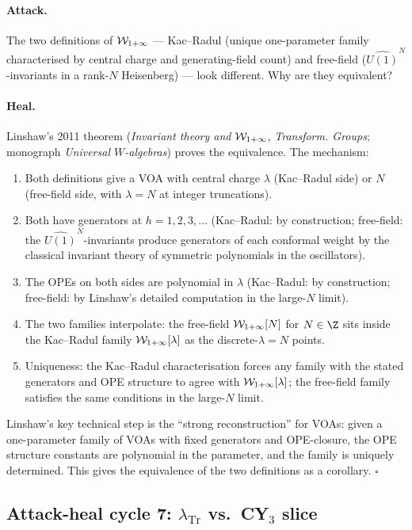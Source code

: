 \paragraph{Attack.}
The two definitions of $\mathcal{W}_{1+\infty}$ --- Kac--Radul (unique one-parameter family
characterised by central charge and generating-field count) and free-field
($\widehat{U(1)}^N$-invariants in a rank-$N$ Heisenberg) --- look different. Why are
they equivalent?

\paragraph{Heal.}
Linshaw's 2011 theorem (\emph{Invariant theory and $\mathcal{W}_{1+\infty}$}, \emph{Transform. Groups};
monograph \emph{Universal $W$-algebras}) proves the equivalence. The mechanism:
\begin{enumerate}
\item Both definitions give a VOA with central charge $\lambda$ (Kac--Radul side) or
$N$ (free-field side, with $\lambda = N$ at integer truncations).
\item Both have generators at $h = 1, 2, 3, \ldots$ (Kac--Radul: by construction;
free-field: the $\widehat{U(1)}^N$-invariants produce generators of each conformal weight
by the classical invariant theory of symmetric polynomials in the oscillators).
\item The OPEs on both sides are polynomial in $\lambda$ (Kac--Radul: by construction;
free-field: by Linshaw's detailed computation in the large-$N$ limit).
\item The two families interpolate: the free-field $\mathcal{W}_{1+\infty}[N]$ for $N \in \Z$ sits
inside the Kac--Radul family $\mathcal{W}_{1+\infty}[\lambda]$ as the discrete-$\lambda = N$ points.
\item Uniqueness: the Kac--Radul characterisation forces any family with the stated
generators and OPE structure to agree with $\mathcal{W}_{1+\infty}[\lambda]$; the free-field family
satisfies the same conditions in the large-$N$ limit.
\end{enumerate}

Linshaw's key technical step is the ``strong reconstruction'' for VOAs: given a
one-parameter family of VOAs with fixed generators and OPE-closure, the OPE structure
constants are polynomial in the parameter, and the family is uniquely determined.
This gives the equivalence of the two definitions as a corollary.
\hfill$\square$

\subsection{Attack-heal cycle 7: $\lambda_{\mathrm{Tr}}$ vs.\ CY$_3$ slice}
\label{opus:sec:ah-7-lambda-vs-cy3}

